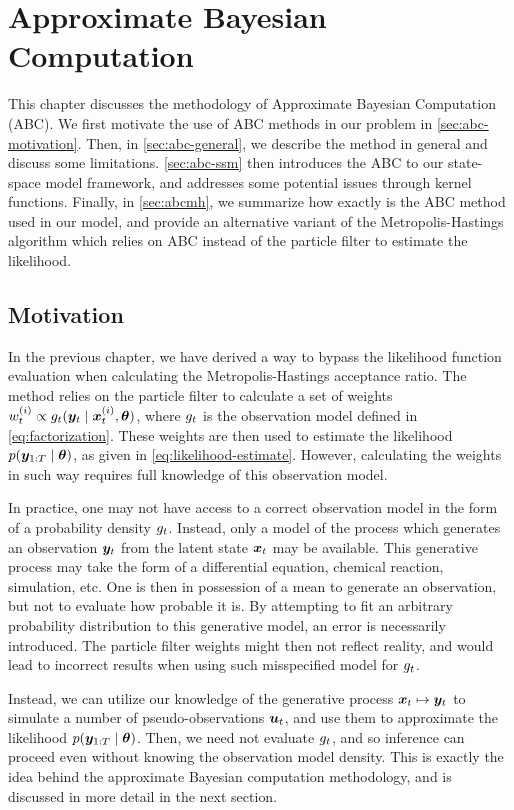 \chapter{Approximate Bayesian Computation}
\label{chap:abc}

This chapter discusses the methodology of Approximate Bayesian Computation (ABC). We first motivate the use of ABC methods in our problem in \autoref{sec:abc-motivation}. Then, in \autoref{sec:abc-general}, we describe the method in general and discuss some limitations. \autoref{sec:abc-ssm} then introduces the ABC to our state-space model framework, and addresses some potential issues through kernel functions. Finally, in \autoref{sec:abcmh}, we summarize how exactly is the ABC method used in our model, and provide an alternative variant of the Metropolis-Hastings algorithm which relies on ABC instead of the particle filter to estimate the likelihood.


\section{Motivation} \label{sec:abc-motivation}
In the previous chapter, we have derived a way to bypass the likelihood function evaluation when calculating the Metropolis-Hastings acceptance ratio. The method relies on the particle filter to calculate a set of weights $w_t^{(i)} \propto g_t(\bm{y}_t \mid \bm{x}_t^{(i)}, \bm{\theta})$, where $g_t$ is the observation model defined in \eqref{eq:factorization}. These weights are then used to estimate the likelihood $p(\bm{y}_{1:T} \mid \bm{\theta})$, as given in \eqref{eq:likelihood-estimate}. However, calculating the weights in such way requires full knowledge of this observation model.

In practice, one may not have access to a correct observation model in the form of a probability density $g_t$. Instead, only a model of the process which generates an observation $\bm{y}_t$ from the latent state $\bm{x}_t$ may be available. This generative process may take the form of a differential equation, chemical reaction, simulation, etc. One is then in possession of a mean to generate an observation, but not to evaluate how probable it is. By attempting to fit an arbitrary probability distribution to this generative model, an error is necessarily introduced. The particle filter weights might then not reflect reality, and would lead to incorrect results when using such misspecified model for $g_t$.

Instead, we can utilize our knowledge of the generative process $\bm{x}_t \mapsto \bm{y}_t$ to simulate a number of pseudo-observations $\bm{u}_t$, and use them to approximate the likelihood $p(\bm{y}_{1:T} \mid \bm{\theta})$. Then, we need not evaluate $g_t$, and so inference can proceed even without knowing the observation model density. This is exactly the idea behind the approximate Bayesian computation methodology, and is discussed in more detail in the next section.

